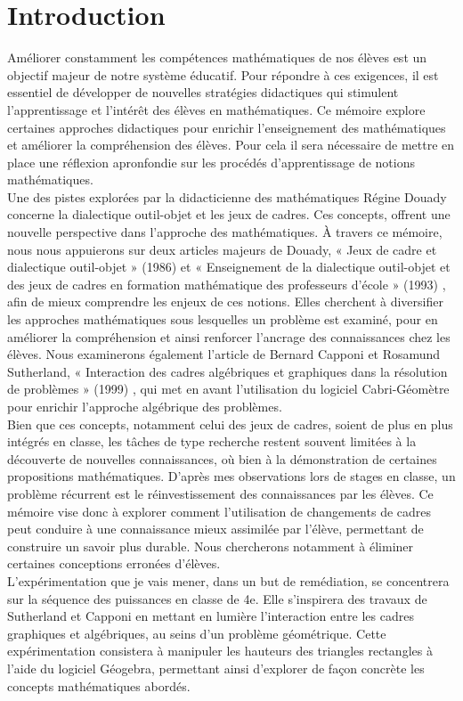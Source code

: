 \section*{Introduction}

Améliorer constamment les compétences mathématiques de nos élèves est un objectif majeur de notre système éducatif.
Pour répondre à ces exigences,
il est essentiel de développer de nouvelles stratégies didactiques qui stimulent l'apprentissage et l'intérêt des élèves en mathématiques.
Ce mémoire explore certaines approches didactiques pour enrichir l'enseignement des mathématiques et améliorer la compréhension des élèves. 
Pour cela il sera nécessaire de mettre en place une réflexion apronfondie sur les procédés d'apprentissage de notions mathématiques.\\

Une des pistes explorées par la didacticienne des mathématiques Régine Douady concerne la dialectique outil-objet et les jeux de cadres.
Ces concepts,
offrent une nouvelle perspective dans l'approche des mathématiques.
À travers ce mémoire, nous nous appuierons sur deux articles majeurs de Douady,
« Jeux de cadre et dialectique outil-objet » (1986) \cite{douady1} et « Enseignement de la dialectique outil-objet et des jeux de cadres en formation mathématique des professeurs d'école » (1993) \cite{douady2},
afin de mieux comprendre les enjeux de ces notions.
Elles cherchent à diversifier les approches mathématiques sous lesquelles un problème est examiné,
pour en améliorer la compréhension et ainsi renforcer l'ancrage des connaissances chez les élèves.
Nous examinerons également l'article de Bernard Capponi et Rosamund Sutherland,
« Interaction des cadres algébriques et graphiques dans la résolution de problèmes » (1999) \cite{capponi},
qui met en avant l'utilisation du logiciel Cabri-Géomètre pour enrichir l'approche algébrique des problèmes.\\

Bien que ces concepts, notamment celui des jeux de cadres, soient de plus en plus intégrés en classe,
les tâches de type recherche restent souvent limitées à la découverte de nouvelles connaissances,
où bien à la démonstration de certaines propositions mathématiques.
D'après mes observations lors de stages en classe,
un problème récurrent est le réinvestissement des connaissances par les élèves.
Ce mémoire vise donc à explorer comment l'utilisation de changements de cadres peut conduire à une connaissance mieux assimilée par l'élève,
permettant de construire un savoir plus durable.
Nous chercherons notamment à éliminer certaines conceptions erronées d'élèves.\\

L'expérimentation que je vais mener,
dans un but de remédiation,
se concentrera sur la séquence des puissances en classe de 4e.
Elle s'inspirera des travaux de Sutherland et Capponi en mettant en lumière l'interaction entre les cadres graphiques et algébriques,
au seins d'un problème géométrique.
Cette expérimentation consistera à manipuler les hauteurs des triangles rectangles à l'aide du logiciel Géogebra,
permettant ainsi d'explorer de façon concrète les concepts mathématiques abordés.